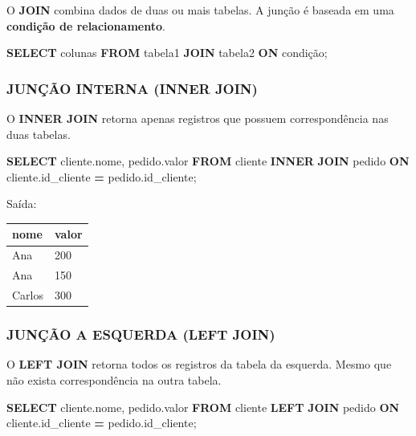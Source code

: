 \documentclass[
]{book}
\newenvironment{Shaded}{\begin{snugshade}}{\end{snugshade}}
\newcommand{\KeywordTok}[1]{\textcolor[rgb]{0.13,0.29,0.53}{\textbf{#1}}}
\newcommand{\NormalTok}[1]{#1}
\newcommand{\OperatorTok}[1]{\textcolor[rgb]{0.81,0.36,0.00}{\textbf{#1}}}
\begin{document}
O \textbf{JOIN} combina dados de duas ou mais tabelas. A junção é baseada em uma \textbf{condição de relacionamento}.

\begin{Shaded}
\begin{Highlighting}[]
\KeywordTok{SELECT}\NormalTok{ colunas}
\KeywordTok{FROM}\NormalTok{ tabela1}
\KeywordTok{JOIN}\NormalTok{ tabela2}
\KeywordTok{ON}\NormalTok{ condição;}
\end{Highlighting}
\end{Shaded}

\subsubsection{JUNÇÃO INTERNA (INNER JOIN)}\label{junuxe7uxe3o-interna-inner-join}

O \textbf{INNER JOIN} retorna apenas registros que possuem correspondência nas duas tabelas.

\begin{Shaded}
\begin{Highlighting}[]
\KeywordTok{SELECT}\NormalTok{ cliente.nome, pedido.valor}
\KeywordTok{FROM}\NormalTok{ cliente}
\KeywordTok{INNER} \KeywordTok{JOIN}\NormalTok{ pedido}
\KeywordTok{ON}\NormalTok{ cliente.id\_cliente }\OperatorTok{=}\NormalTok{ pedido.id\_cliente;}
\end{Highlighting}
\end{Shaded}

Saída:

\begin{longtable}[]{@{}ll@{}}
\toprule\noalign{}
nome & valor \\
\midrule\noalign{}
\endhead
\bottomrule\noalign{}
\endlastfoot
Ana & 200 \\
Ana & 150 \\
Carlos & 300 \\
\end{longtable}

\subsubsection{JUNÇÃO A ESQUERDA (LEFT JOIN)}\label{junuxe7uxe3o-a-esquerda-left-join}

O \textbf{LEFT JOIN} retorna todos os registros da tabela da esquerda. Mesmo que não exista correspondência na outra tabela.

\begin{Shaded}
\begin{Highlighting}[]
\KeywordTok{SELECT}\NormalTok{ cliente.nome, pedido.valor}
\KeywordTok{FROM}\NormalTok{ cliente}
\KeywordTok{LEFT} \KeywordTok{JOIN}\NormalTok{ pedido}
\KeywordTok{ON}\NormalTok{ cliente.id\_cliente }\OperatorTok{=}\NormalTok{ pedido.id\_cliente;}
\end{Highlighting}
\end{Shaded}
\end{document}
